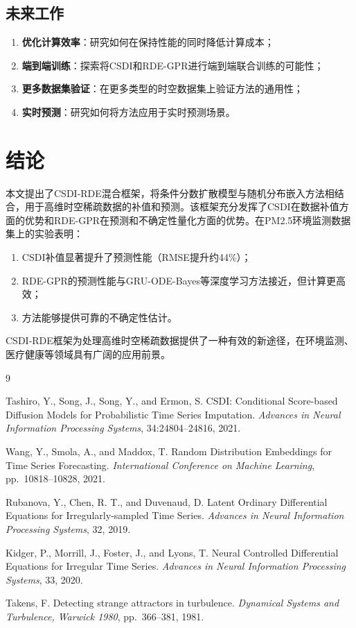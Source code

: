 \documentclass[12pt,a4paper]{article}
\begin{document}
\subsection{未来工作}

\begin{enumerate}
    \item \textbf{优化计算效率}：研究如何在保持性能的同时降低计算成本；
    \item \textbf{端到端训练}：探索将CSDI和RDE-GPR进行端到端联合训练的可能性；
    \item \textbf{更多数据集验证}：在更多类型的时空数据集上验证方法的通用性；
    \item \textbf{实时预测}：研究如何将方法应用于实时预测场景。
\end{enumerate}

\section{结论}

本文提出了CSDI-RDE混合框架，将条件分数扩散模型与随机分布嵌入方法相结合，用于高维时空稀疏数据的补值和预测。该框架充分发挥了CSDI在数据补值方面的优势和RDE-GPR在预测和不确定性量化方面的优势。在PM2.5环境监测数据集上的实验表明：
\begin{enumerate}
    \item CSDI补值显著提升了预测性能（RMSE提升约44\%）；
    \item RDE-GPR的预测性能与GRU-ODE-Bayes等深度学习方法接近，但计算更高效；
    \item 方法能够提供可靠的不确定性估计。
\end{enumerate}

CSDI-RDE框架为处理高维时空稀疏数据提供了一种有效的新途径，在环境监测、医疗健康等领域具有广阔的应用前景。

\begin{thebibliography}{9}

Tashiro, Y., Song, J., Song, Y., and Ermon, S.
CSDI: Conditional Score-based Diffusion Models for Probabilistic Time Series Imputation.
\textit{Advances in Neural Information Processing Systems}, 34:24804--24816, 2021.

Wang, Y., Smola, A., and Maddox, T.
Random Distribution Embeddings for Time Series Forecasting.
\textit{International Conference on Machine Learning}, pp.~10818--10828, 2021.

Rubanova, Y., Chen, R. T., and Duvenaud, D.
Latent Ordinary Differential Equations for Irregularly-sampled Time Series.
\textit{Advances in Neural Information Processing Systems}, 32, 2019.

Kidger, P., Morrill, J., Foster, J., and Lyons, T.
Neural Controlled Differential Equations for Irregular Time Series.
\textit{Advances in Neural Information Processing Systems}, 33, 2020.

Takens, F.
Detecting strange attractors in turbulence.
\textit{Dynamical Systems and Turbulence, Warwick 1980}, pp.~366--381, 1981.

\end{thebibliography}
\end{document}
